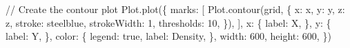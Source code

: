 \documentclass[
  letterpaper,
  DIV=11,
  numbers=noendperiod]{scrartcl}
\newenvironment{Shaded}{\begin{snugshade}}{\end{snugshade}}
\newcommand{\NormalTok}[1]{\textcolor[rgb]{0.00,0.23,0.31}{#1}}
\begin{document}
\begin{Shaded}
\begin{Highlighting}[]
\NormalTok{// Create the contour plot}
\NormalTok{Plot.plot(\{}
\NormalTok{  marks: [}
\NormalTok{    Plot.contour(grid, \{}
\NormalTok{      x: \textquotesingle{}x\textquotesingle{},}
\NormalTok{      y: \textquotesingle{}y\textquotesingle{},}
\NormalTok{      z: \textquotesingle{}z\textquotesingle{},}
\NormalTok{      stroke: \textquotesingle{}steelblue\textquotesingle{},}
\NormalTok{      strokeWidth: 1,}
\NormalTok{      thresholds: 10,}
\NormalTok{    \}),}
\NormalTok{  ],}
\NormalTok{  x: \{}
\NormalTok{    label: \textquotesingle{}X\textquotesingle{},}
\NormalTok{  \},}
\NormalTok{  y: \{}
\NormalTok{    label: \textquotesingle{}Y\textquotesingle{},}
\NormalTok{  \},}
\NormalTok{  color: \{}
\NormalTok{    legend: true,}
\NormalTok{    label: \textquotesingle{}Density\textquotesingle{},}
\NormalTok{  \},}
\NormalTok{  width: 600,}
\NormalTok{  height: 600,}
\NormalTok{\})}
\end{Highlighting}
\end{Shaded}



\printbibliography
\end{document}
